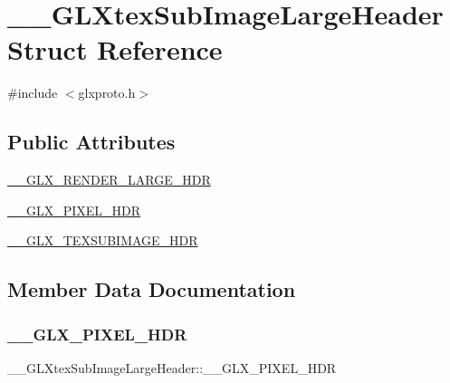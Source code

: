 \hypertarget{struct_____g_l_xtex_sub_image_large_header}{}\section{\+\_\+\+\_\+\+G\+L\+Xtex\+Sub\+Image\+Large\+Header Struct Reference}
\label{struct_____g_l_xtex_sub_image_large_header}


{\ttfamily \#include $<$glxproto.\+h$>$}

\subsection*{Public Attributes}
\begin{DoxyCompactItemize}
\item 
\hyperlink{struct_____g_l_xtex_sub_image_large_header_a1cdfbcbb8f1aa507b97f149b840fc10d}{\+\_\+\+\_\+\+G\+L\+X\+\_\+\+R\+E\+N\+D\+E\+R\+\_\+\+L\+A\+R\+G\+E\+\_\+\+H\+DR}
\item 
\hyperlink{struct_____g_l_xtex_sub_image_large_header_abc428a514a8e1b58bd1c502074b6c779}{\+\_\+\+\_\+\+G\+L\+X\+\_\+\+P\+I\+X\+E\+L\+\_\+\+H\+DR}
\item 
\hyperlink{struct_____g_l_xtex_sub_image_large_header_a8e33fb3ad0f43a2982ae8a463df5c598}{\+\_\+\+\_\+\+G\+L\+X\+\_\+\+T\+E\+X\+S\+U\+B\+I\+M\+A\+G\+E\+\_\+\+H\+DR}
\end{DoxyCompactItemize}


\subsection{Member Data Documentation}
\mbox{\label{struct_____g_l_xtex_sub_image_large_header_abc428a514a8e1b58bd1c502074b6c779}} 
\subsubsection{\texorpdfstring{\+\_\+\+\_\+\+G\+L\+X\+\_\+\+P\+I\+X\+E\+L\+\_\+\+H\+DR}{\_\_GLX\_PIXEL\_HDR}}
{\footnotesize\ttfamily \+\_\+\+\_\+\+G\+L\+Xtex\+Sub\+Image\+Large\+Header\+::\+\_\+\+\_\+\+G\+L\+X\+\_\+\+P\+I\+X\+E\+L\+\_\+\+H\+DR}

